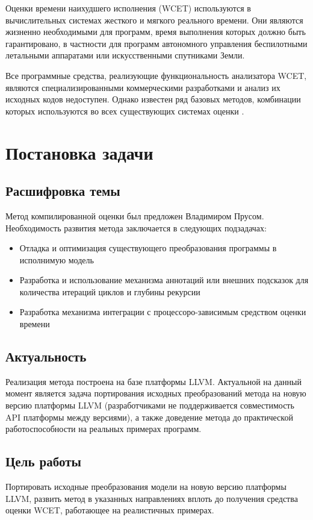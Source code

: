 \documentclass[12pt,a4paper]{article}
\begin{document}
Оценки времени наихудшего исполнения (WCET) используются в вычислительных системах жесткого и мягкого реального времени. Они являются жизненно необходимыми для программ, время выполнения которых должно быть гарантировано, в частности для программ автономного управления беспилотными летальными аппаратами или искусственными спутниками Земли.

Все программные средства, реализующие функциональность анализатора WCET, являются специализированными коммерческими разработками и анализ их исходных кодов недоступен. Однако известен ряд базовых методов, комбинации которых используются во всех существующих системах оценки  \cite{comsurvey}.

\section{Постановка задачи}

\subsection{Расшифровка темы}
Метод компилированной оценки был предложен Владимиром Прусом\cite{prus}. Необходимость развития метода заключается в следующих подзадачах:
\begin{itemize}
    \item Отладка и оптимизация существующего преобразования программы в исполнимую модель
    \item Разработка и использование механизма аннотаций или внешних подсказок для количества итераций циклов и глубины рекурсии
    \item Разработка механизма интеграции с процессоро-зависимым средством оценки времени
\end{itemize}


\subsection{Актуальность}
Реализация метода построена на базе платформы LLVM. Актуальной на данный момент является задача портирования исходных преобразований метода на новую версию платформы LLVM (разработчиками не поддерживается совместимость API платформы между версиями), а также доведение метода до практической работоспособности на реальных примерах программ. 

\subsection{Цель работы}
Портировать исходные преобразования модели на новую версию платформы LLVM, развить метод в указанных направлениях вплоть до получения средства оценки WCET, работающее на реалистичных примерах.
\end{document}
